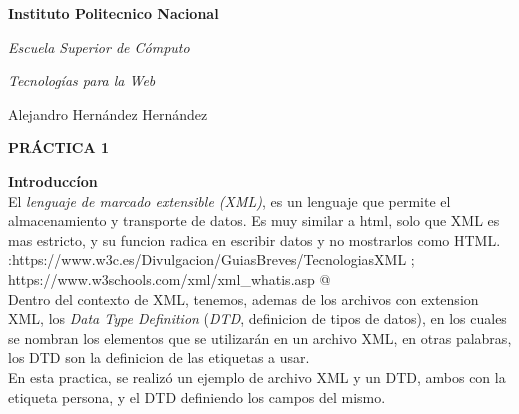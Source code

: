 \documentclass[12pt,letterpaper]{article}
\begin{document}
{\Huge {\rm { \bf Instituto Politecnico Nacional}}}\\
\begin{center}
{\huge {\rm {\em Escuela Superior de C\'omputo}}} \\
\end{center}
\begin{center}
{\Large {\em Tecnolog\'ias para la Web}}\\
\end{center}
\begin{center}
{\Large Alejandro Hern\'andez Hern\'andez}\\
\end{center}
\begin{center}
{\huge {\bf PR\'ACTICA 1}}
\end{center}


\newpage
{\Huge {\rm {\bf Introducc\'ion}}}
\\

El {\em lenguaje de marcado extensible (XML)}, es un lenguaje que permite el almacenamiento y transporte de datos. Es muy similar a html, solo que XML es mas estricto, y su funcion radica en escribir datos y no mostrarlos como HTML.\\
\vspace{2mm}
{\tiny {\verb@referencia:https://www.w3c.es/Divulgacion/GuiasBreves/TecnologiasXML ; https://www.w3schools.com/xml/xml_whatis.asp @}}
\\

Dentro del contexto de XML, tenemos, ademas de los archivos con extension XML, los {\em Data Type Definition} ({\em DTD}, definicion de tipos de datos), en los cuales se nombran los elementos que se utilizar\'an en un archivo XML, en otras palabras, los DTD son la definicion de las etiquetas a usar. \\En esta practica, se realiz\'o un ejemplo de archivo XML y un DTD, ambos con la etiqueta persona, y el DTD definiendo los campos del mismo.  
\end{document}
